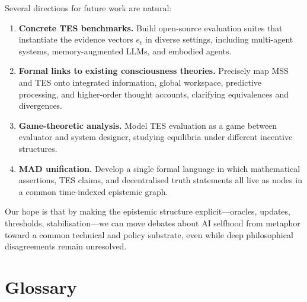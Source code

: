 \documentclass[11pt]{article}
\newcommand{\1}{\mathbf{1}}
\begin{document}
Several directions for future work are natural:

\begin{enumerate}[leftmargin=2em]
  \item \textbf{Concrete TES benchmarks.}
  Build open-source evaluation suites that instantiate the evidence vectors
  $e_t$ in diverse settings, including multi-agent systems, memory-augmented
  LLMs, and embodied agents.

  \item \textbf{Formal links to existing consciousness theories.}
  Precisely map MSS and TES onto integrated information, global workspace,
  predictive processing, and higher-order thought accounts, clarifying
  equivalences and divergences.

  \item \textbf{Game-theoretic analysis.}
  Model TES evaluation as a game between evaluator and system designer,
  studying equilibria under different incentive structures.

  \item \textbf{MAD unification.}
  Develop a single formal language in which mathematical assertions,
  TES claims, and decentralised truth statements all live as nodes in a
  common time-indexed epistemic graph.
\end{enumerate}

Our hope is that by making the epistemic structure explicit---oracles,
updates, thresholds, stabilisation---we can move debates about AI selfhood
from metaphor toward a common technical and policy substrate, even while deep
philosophical disagreements remain unresolved.

\appendix

\section{Glossary}
\end{document}
